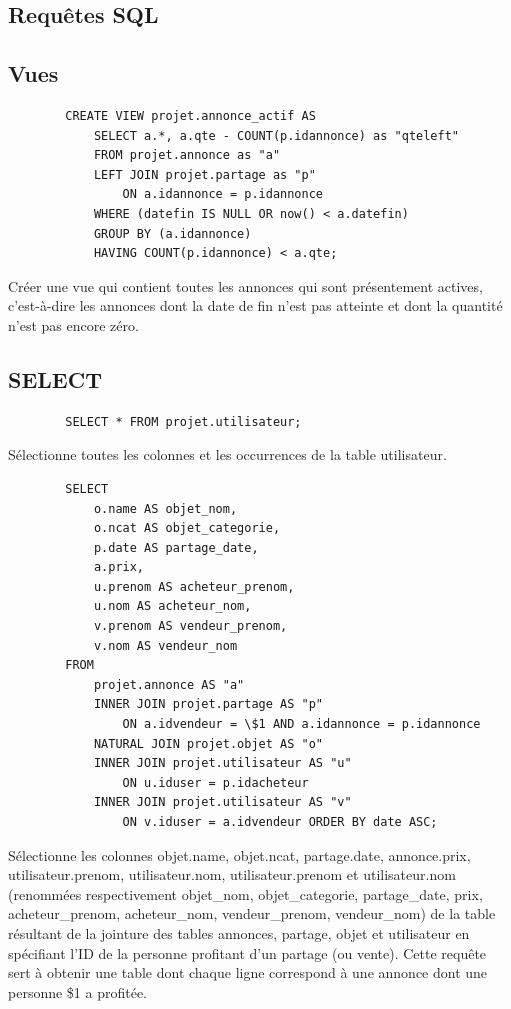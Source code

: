 \documentclass[a4paper,12pt]{article}
\begin{document}
\begin{spacing}{1}
	\section*{Requêtes SQL}
	\subsection*{Vues}
	
	\begin{verbatim}
	    CREATE VIEW projet.annonce_actif AS
            SELECT a.*, a.qte - COUNT(p.idannonce) as "qteleft"
            FROM projet.annonce as "a"
            LEFT JOIN projet.partage as "p" 
                ON a.idannonce = p.idannonce
            WHERE (datefin IS NULL OR now() < a.datefin)
            GROUP BY (a.idannonce)
            HAVING COUNT(p.idannonce) < a.qte;

	\end{verbatim}
	Créer une vue qui contient toutes les annonces qui sont présentement actives, c'est-à-dire les annonces dont la date de fin n'est pas atteinte et dont la quantité n'est pas encore zéro.
	
	\subsection*{SELECT}
	
	\begin{verbatim}
	    SELECT * FROM projet.utilisateur;
	\end{verbatim}
	Sélectionne toutes les colonnes et les occurrences de la table utilisateur.
	
	\begin{verbatim}
	    SELECT
    	    o.name AS objet_nom,
    	    o.ncat AS objet_categorie,
    	    p.date AS partage_date,
    	    a.prix,
    	    u.prenom AS acheteur_prenom,
    	    u.nom AS acheteur_nom,
    	    v.prenom AS vendeur_prenom,
    	    v.nom AS vendeur_nom
	    FROM
        	projet.annonce AS "a"
        	INNER JOIN projet.partage AS "p"
        	    ON a.idvendeur = \$1 AND a.idannonce = p.idannonce
        	NATURAL JOIN projet.objet AS "o"
        	INNER JOIN projet.utilisateur AS "u"
        	    ON u.iduser = p.idacheteur
        	INNER JOIN projet.utilisateur AS "v"
        	    ON v.iduser = a.idvendeur ORDER BY date ASC;
    \end{verbatim}
Sélectionne les colonnes objet.name, objet.ncat, partage.date, annonce.prix, utilisateur.prenom, utilisateur.nom, utilisateur.prenom et utilisateur.nom (renommées respectivement objet\_nom, objet\_categorie, partage\_date, prix, acheteur\_prenom, acheteur\_nom, vendeur\_prenom, vendeur\_nom) de la table résultant de la jointure des tables annonces, partage, objet et utilisateur en spécifiant l'ID de la personne profitant d'un partage (ou vente).
Cette requête sert à obtenir une table dont chaque ligne correspond à une annonce dont une personne \$1 a profitée.


\end{spacing}
\end{document}
